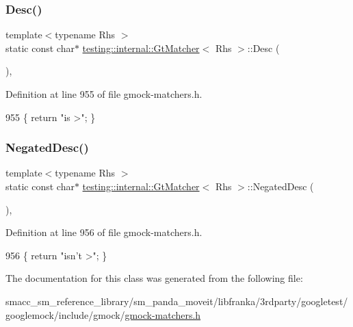 \subsubsection{\texorpdfstring{Desc()}{Desc()}}
{\footnotesize\ttfamily template$<$typename Rhs $>$ \\
static const char$\ast$ \hyperlink{classtesting_1_1internal_1_1GtMatcher}{testing\+::internal\+::\+Gt\+Matcher}$<$ Rhs $>$\+::Desc (\begin{DoxyParamCaption}{ }\end{DoxyParamCaption})\hspace{0.3cm}{\ttfamily [inline]}, {\ttfamily [static]}}



Definition at line 955 of file gmock-\/matchers.\+h.


\begin{DoxyCode}
955 \{ \textcolor{keywordflow}{return} \textcolor{stringliteral}{"is >"}; \}
\end{DoxyCode}
\mbox{\label{classtesting_1_1internal_1_1GtMatcher_ace1dc02e105fd93b638f23433bf682a4}} 
\subsubsection{\texorpdfstring{Negated\+Desc()}{NegatedDesc()}}
{\footnotesize\ttfamily template$<$typename Rhs $>$ \\
static const char$\ast$ \hyperlink{classtesting_1_1internal_1_1GtMatcher}{testing\+::internal\+::\+Gt\+Matcher}$<$ Rhs $>$\+::Negated\+Desc (\begin{DoxyParamCaption}{ }\end{DoxyParamCaption})\hspace{0.3cm}{\ttfamily [inline]}, {\ttfamily [static]}}



Definition at line 956 of file gmock-\/matchers.\+h.


\begin{DoxyCode}
956 \{ \textcolor{keywordflow}{return} \textcolor{stringliteral}{"isn't >"}; \}
\end{DoxyCode}


The documentation for this class was generated from the following file\+:\begin{DoxyCompactItemize}
\item 
smacc\+\_\+sm\+\_\+reference\+\_\+library/sm\+\_\+panda\+\_\+moveit/libfranka/3rdparty/googletest/googlemock/include/gmock/\hyperlink{gmock-matchers_8h}{gmock-\/matchers.\+h}\end{DoxyCompactItemize}

